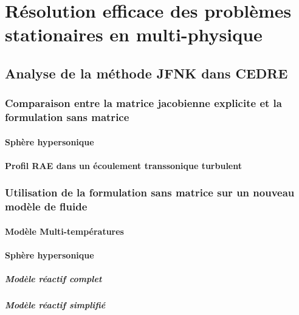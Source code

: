 


\maketitle
\tableofcontents
{}





\part{Résolution efficace des problèmes stationaires en multi-physique}

  

  

  \chapter{Analyse de la méthode JFNK dans CEDRE}
    \section{Comparaison entre la matrice jacobienne explicite et la formulation sans matrice}
      \subsection{Sphère hypersonique}
      \subsection{Profil RAE dans un écoulement transsonique turbulent}
    \section{Utilisation de la formulation sans matrice sur un nouveau modèle de fluide}
      \subsection{Modèle Multi-températures}
      \subsection{Sphère hypersonique}
        \subsubsection{Modèle réactif complet}
        \subsubsection{Modèle réactif simplifié}


